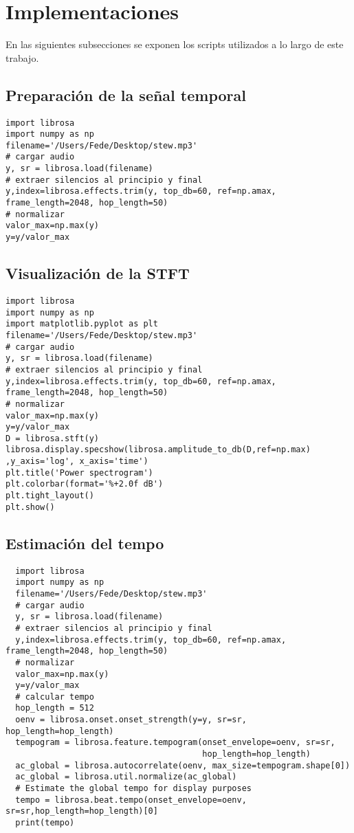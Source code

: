 \documentclass[]{article}
\begin{document}
\newpage
\appendix

\section{Implementaciones}
En las siguientes subsecciones se exponen los scripts utilizados a lo largo de
este trabajo.

\subsection{Preparación de la señal temporal}
\begin{verbatim}
import librosa
import numpy as np
filename='/Users/Fede/Desktop/stew.mp3'
# cargar audio
y, sr = librosa.load(filename)
# extraer silencios al principio y final
y,index=librosa.effects.trim(y, top_db=60, ref=np.amax, frame_length=2048, hop_length=50)
# normalizar
valor_max=np.max(y)
y=y/valor_max
\end{verbatim}

\subsection{Visualización de la STFT}
\begin{verbatim}
import librosa
import numpy as np
import matplotlib.pyplot as plt
filename='/Users/Fede/Desktop/stew.mp3'
# cargar audio
y, sr = librosa.load(filename)
# extraer silencios al principio y final
y,index=librosa.effects.trim(y, top_db=60, ref=np.amax, frame_length=2048, hop_length=50)
# normalizar
valor_max=np.max(y)
y=y/valor_max
D = librosa.stft(y)
librosa.display.specshow(librosa.amplitude_to_db(D,ref=np.max)
,y_axis='log', x_axis='time')
plt.title('Power spectrogram')
plt.colorbar(format='%+2.0f dB')
plt.tight_layout()
plt.show()
\end{verbatim}

\subsection{Estimación del tempo}
\begin{verbatim}
  import librosa
  import numpy as np
  filename='/Users/Fede/Desktop/stew.mp3'
  # cargar audio
  y, sr = librosa.load(filename)
  # extraer silencios al principio y final
  y,index=librosa.effects.trim(y, top_db=60, ref=np.amax, frame_length=2048, hop_length=50)
  # normalizar
  valor_max=np.max(y)
  y=y/valor_max
  # calcular tempo
  hop_length = 512
  oenv = librosa.onset.onset_strength(y=y, sr=sr, hop_length=hop_length)
  tempogram = librosa.feature.tempogram(onset_envelope=oenv, sr=sr,
                                        hop_length=hop_length)
  ac_global = librosa.autocorrelate(oenv, max_size=tempogram.shape[0])
  ac_global = librosa.util.normalize(ac_global)
  # Estimate the global tempo for display purposes
  tempo = librosa.beat.tempo(onset_envelope=oenv, sr=sr,hop_length=hop_length)[0]
  print(tempo)
\end{verbatim}
\end{document}
